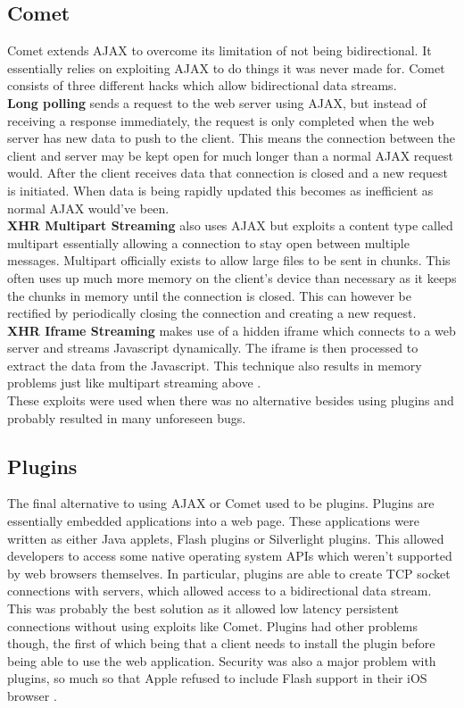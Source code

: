 \documentclass[prodmode,acmtecs]{acmsmall}
\begin{document}
\subsection{Comet}
Comet extends AJAX to overcome its limitation of not being bidirectional. It essentially relies on exploiting AJAX to do things it was never made for. Comet consists of three different hacks which allow bidirectional data streams. \\
\textbf{Long polling} sends a request to the web server using AJAX, but instead of receiving a response immediately, the request is only completed when the web server has new data to push to the client. This means the connection between the client and server may be kept open for much longer than a normal AJAX request would. After the client receives data that connection is closed and a new request is initiated. When data is being rapidly updated this becomes as inefficient as normal AJAX would've been.\\
\textbf{XHR Multipart Streaming} also uses AJAX but exploits a content type called multipart essentially allowing a connection to stay open between multiple messages. Multipart officially exists to allow large files to be sent in chunks. This often uses up much more memory on the client's device than necessary as it keeps the chunks in memory until the connection is closed. This can however be rectified by periodically closing the connection and creating a new request.\\
\textbf{XHR Iframe Streaming} makes use of a hidden iframe which connects to a web server and streams Javascript dynamically. The iframe is then processed to extract the data from the Javascript. This technique also results in memory problems just like multipart streaming above \cite{gutwin2011real}.\\
These exploits were used when there was no alternative besides using plugins and probably resulted in many unforeseen bugs.

\subsection{Plugins}
The final alternative to using AJAX or Comet used to be plugins. Plugins are essentially embedded applications into a web page. These applications were written as either Java applets, Flash plugins or Silverlight plugins. This allowed developers to access some native operating system APIs which weren't supported by web browsers themselves. In particular, plugins are able to create TCP socket connections with servers, which allowed access to a bidirectional data stream. This was probably the best solution as it allowed low latency persistent connections without using exploits like Comet. Plugins had other problems though, the first of which being that a client needs to install the plugin before being able to use the web application. Security was also a major problem with plugins, so much so that Apple refused to include Flash support in their iOS browser \cite{gutwin2011real}.\\\\
\end{document}
